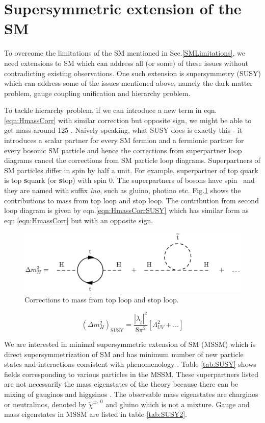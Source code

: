 \section{Supersymmetric extension of the SM}
To overcome the limitations of the SM mentioned in Sec.\ref{SMLimitations}, we need extensions to SM which can address all (or some) of these 
issues without contradicting existing observations. One such extension is supersymmetry (SUSY) which can address some of the issues 
mentioned above, namely the dark matter problem, gauge coupling unification and hierarchy problem.

To tackle hierarchy problem, if we can introduce a new term in eqn.\ref{eqn:HmassCorr} with similar correction but opposite sign, we might 
be able to get \higgs mass around 125 \gev. Naively speaking, what SUSY does is exactly this - it introduces a scalar partner for every SM 
fermion and a fermionic partner for every bosonic SM particle and hence the corrections from superpartner loop diagrams cancel the 
corrections from SM particle loop diagrams. 
Superpartners of SM particles differ in spin by half a unit. For example, superpartner of top quark is top 
\textbf{s}quark (or \textbf{s}top) with spin 0. The superpartners of bosons have spin \textonehalf\ and they are named with suffix 
\textit{ino}, such as gluino, photino etc. Fig.\ref{fig:hierarchy_problem_higgs_mass_stop} shows the contributions to \higgs mass from top 
loop and stop loop. The contribution from second loop diagram is given by eqn.\ref{eqn:HmassCorrSUSY} which has similar form as 
eqn.\ref{eqn:HmassCorr} but with an opposite sign.
\begin{figure}[h!]
\centering
\includegraphics[width=0.8\linewidth]{../Figures/Chap1/hierarchy_problem_higgs_mass_stop}
\caption{Corrections to \higgs mass from top loop and stop loop.}
\label{fig:hierarchy_problem_higgs_mass_stop}
\end{figure}
\begin{equation}
(\Delta m_{H}^2)_{\text{SUSY}} = \frac{|\lambda_{\tilde{t}}|^2}{8\pi^2}[\Lambda_{UV}^2 + \dots]
\label{eqn:HmassCorrSUSY}
\end{equation}

We are interested in minimal supersymmetric extension of SM (MSSM) which is direct supersymmetrization of SM and has minimum number of new 
particle states and interactions consistent with phenomenology \cite{baer_tata_2006}. Table \ref{tab:SUSY} shows fields corresponding to 
various particles in the MSSM. These superpartners listed are not necessarily the mass eigenstates of the theory because there can be 
mixing of gauginos and higgsinos \cite{Martin:1997ns}. The observable mass eigenstates are charginos or neutralinos, denoted by 
$\tilde{\chi}^{\pm,\ 0}$ and gluino which is not a mixture. Gauge and mass eigenstates in MSSM are listed in table \ref{tab:SUSY2}.

